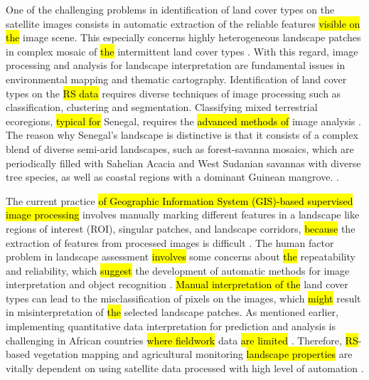\documentclass[earth,article,submit,pdftex,moreauthors]{Definitions/mdpi}
\begin{document}
One of the challenging {problems} in identification of land cover types on the satellite images consists in automatic extraction of the reliable features \hl{visible on the }image scene{. This especially concerns }highly heterogeneous landscape patches in complex mosaic of \hl{the }intermittent land cover types \cite{CAMPOS2018211,SYIFA2020919}. With this regard, image processing and analysis for landscape interpretation {are} fundamental {issues} in environmental mapping and thematic cartography. Identification of land cover types on the \hl{RS data} requires diverse techniques of image processing such as classification, clustering and segmentation. {Classifying} mixed terrestrial ecoregions, \hl{typical for} Senegal, requires the \hl{advanced methods of} image analysis \cite{BUDDE2004481}. {The reason why Senegal's} landscape is distinctive {is that it consists of} a complex {blend} of diverse semi-arid landscapes, such as forest-savanna mosaics, {which are periodically filled} with Sahelian Acacia and West Sudanian {savannas} with diverse tree species, as well as coastal regions with {a dominant} Guinean {mangrove}.
\cite{TAPPAN2004427,DEANS2003253}.

{The current practice \hl{of Geographic Information System (GIS)-based supervised image processing }involves manually marking different} features in {a\hl{ }landscape like} regions of interest (ROI), singular patches, and landscape corridors, \hl{because} the {extraction of features from processed images is difficult}
 \cite{CABRAL2017115}. {The} human factor {problem} in landscape {assessment} \hl{involves }some concerns {about} \hl{the }repeatability and reliability, which \hl{suggest} the development of automatic methods {for} image interpretation and {object} recognition \cite{CONCHEDDA2008578,rs9020181,rs12091436}. \hl{Manual interpretation of the} land cover types can {lead to the} misclassification of pixels on the images, which \hl{might }{result in} misinterpretation of \hl{the }selected landscape patches. {As mentioned earlier, implementing quantitative} data interpretation for prediction and analysis {is challenging} in African countries \hl{where fieldwork} data \hl{are limited }\cite{STOORVOGEL2009161}. Therefore, \hl{RS}{-based vegetation mapping and agricultural monitoring \hl{landscape properties }are vitally dependent} on using satellite data processed with high level of automation
 \cite{PEREZHOYOS2020102064,BRANDT2016215}.  
\end{document}
